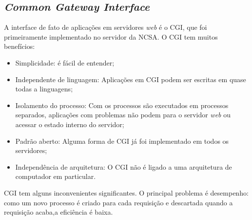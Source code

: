 \subsection{\textit{Common Gateway Interface}}
A interface de fato de aplicações em servidores \textit{web} é o CGI, que foi primeiramente implementado no servidor da NCSA. O CGI tem muitos benefícios:
\begin{itemize}
	\item Simplicidade: é fácil de entender;
	\item Independente de linguagem: Aplicações em CGI podem ser escritas em quase todas a linguagens;
	\item Isolamento do processo: Com os processos são executados em processos separados, aplicações com problemas não podem para o servidor \textit{web} ou acessar o estado interno do servidor;
	\item Padrão aberto: Alguma forma de CGI já foi implementado em todos os servidores;
	\item Independência de arquitetura: O CGI não é ligado a uma arquitetura de computador em particular.
\end{itemize}
CGI tem alguns inconvenientes significantes. O principal problema é desempenho: como um novo processo é criado para cada requisição e descartada quando a requisição acaba,a eficiência é baixa.
